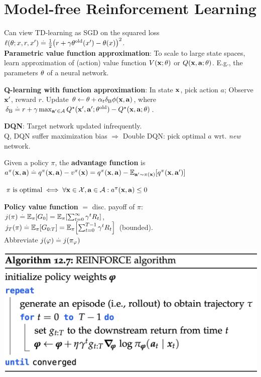 \section{Model-free Reinforcement Learning}
Can view TD-learning as SGD on the squared loss $\ell(\vtheta; x, r, x') \defeq \frac{1}{2}\parentheses*{r + \gamma \old{\vtheta}(x') - \vtheta(x)}^2$. \\
\textbf{Parametric value function approximation}: To scale to large state spaces, learn approximation
of (action) value function $\V{\vx; \vtheta}$ or $\Q{\vx}{\va; \vtheta}$. E.g., the parameters $\mathbf{\theta}$ of a neural network.
\begin{framed}
    \textbf{Q-learning with function approximation}: In state $\mathbf{x}$, pick action $a$; Observe $\mathbf{x}'$, reward $r$. Update $\mathbf{\theta} \gets \mathbf{\theta} + \alpha_t \delta_\mathrm{B} \mathbf{\phi}(\mathbf{x}, \mathbf{a})$, where $\delta_\mathrm{B} \defeq r + \gamma \max_{\vap \in \spA} \Q*{\vxp}{\vap; \old{\vtheta}} - \Q*{\vx}{\va; \vtheta}$.
\end{framed}
\textbf{DQN}: Target network updated infrequently. \\
Q, DQN suffer maximization bias $\Rightarrow$ Double DQN: pick optimal $a$ wrt. \textit{new} network.
\begin{framed}
    Given a policy $\pi$, the \textbf{advantage function} is $\a[\pi]{\vx}{\va} \defeq \q[\pi]{\vx}{\va} - \v[\pi]{\vx} = \q[\pi]{\vx}{\va} - \E[\vap \sim \pi(\vx)]{\q[\pi]{\vx}{\vap}}$
\end{framed}
$\text{$\pi$ is optimal} \iff \forall \vx \in \spX, \va \in \spA : \a[\pi]{\vx}{\va} \leq 0$
\begin{framed}
    \textbf{Policy value function} $=$ disc. payoff of $\pi$: \\
    $\j{\pi} \defeq \E[\pi]{G_0} = \E[\pi]{\sum_{t=0}^\infty \gamma^t R_t}$, \\
     $\j{\pi}[T] \defeq \E[\pi]{G_{0:T}} = \E[\pi]{\sum_{t=0}^{T-1} \gamma^t R_t}$ (bounded). \\
    Abbreviate $\j{\vvarphi} \defeq \j{\pi_\vvarphi}$
\end{framed}
\includegraphics[width=0.9\linewidth]{images/REINFORCE.png}
